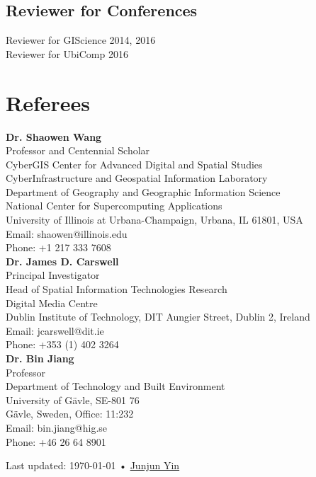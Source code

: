 \documentclass[11pt, a4paper]{article}
\begin{document}
\subsection*{Reviewer for Conferences}
Reviewer for GIScience {2014, 2016}\\
Reviewer for UbiComp {2016}

\section*{Referees}
\noindent
\textbf{Dr. Shaowen Wang}\\
Professor and Centennial Scholar\\
CyberGIS Center for Advanced Digital and Spatial Studies\\
CyberInfrastructure and Geospatial Information Laboratory\\
Department of Geography and Geographic Information Science\\
National Center for Supercomputing Applications\\
University of Illinois at Urbana-Champaign, Urbana, IL 61801, USA\\
Email: shaowen@illinois.edu\\
Phone: +1 217 333 7608\\

\textbf{Dr. James D. Carswell}\\
Principal Investigator\\
Head of Spatial Information Technologies Research\\
Digital Media Centre\\
Dublin Institute of Technology, DIT Aungier Street, Dublin 2, Ireland\\
Email: jcarswell@dit.ie\\
Phone: +353 (1) 402 3264 \\

\textbf{Dr. Bin Jiang}\\
Professor\\
Department of Technology and Built Environment\\
University of Gävle, SE-801 76\\
Gävle, Sweden, Office: 11:232\\
Email: bin.jiang@hig.se\\
Phone: +46 26 64 8901\\
\vfill{}

\begin{center}
{\scriptsize  Last updated: \today\- •\- 
\href{http://sites.google.com/site/yinjunjun}{Junjun Yin}}
\end{center}
\end{document}
